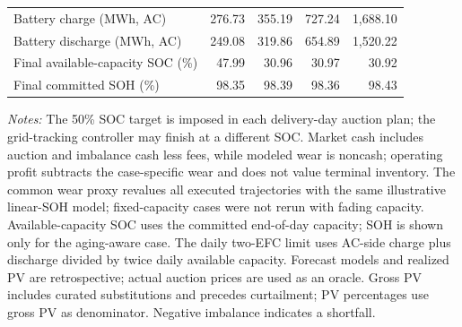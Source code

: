 \begin{table}[htbp]
{\begin{tabular}{lrrrr}
Battery charge (MWh, AC) & 276.73 & 355.19 & 727.24 & 1,688.10 \\
Battery discharge (MWh, AC) & 249.08 & 319.86 & 654.89 & 1,520.22 \\
Final available-capacity SOC (\%) & 47.99 & 30.96 & 30.97 & 30.92 \\
Final committed SOH (\%) & 98.35 & 98.39 & 98.36 & 98.43 \\
\hline
\end{tabular}%
}
\par\smallskip
\parbox{0.98\textwidth}{\footnotesize\textit{Notes:} The 50\% SOC target is imposed in each delivery-day auction plan; the grid-tracking controller may finish at a different SOC. Market cash includes auction and imbalance cash less fees, while modeled wear is noncash; operating profit subtracts the case-specific wear and does not value terminal inventory. The common wear proxy revalues all executed trajectories with the same illustrative linear-SOH model; fixed-capacity cases were not rerun with fading capacity. Available-capacity SOC uses the committed end-of-day capacity; SOH is shown only for the aging-aware case. The daily two-EFC limit uses AC-side charge plus discharge divided by twice daily available capacity. Forecast models and realized PV are retrospective; actual auction prices are used as an oracle. Gross PV includes curated substitutions and precedes curtailment; PV percentages use gross PV as denominator. Negative imbalance indicates a shortfall.}
\end{table}
